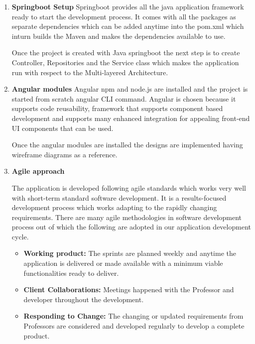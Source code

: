 \begin{enumerate}
        \item \textbf{Springboot Setup}\newline
        Springboot provides all the java application framework ready to start the development process. It comes with all the packages as separate dependencies which can be added anytime into the pom.xml which inturn builds the Maven and makes the dependencies available to use.
        
        Once the project is created with Java springboot the next step is to create Controller, Repositories and the Service class which makes the application run with respect to the Multi-layered Architecture. \newline
        
        \item \textbf{Angular modules}\newline
        Angular npm and node.js are installed and the project is started from scratch angular CLI command. 
        Angular is chosen because it supports code reusability, framework that supports component based development and supports many enhanced integration for appealing front-end UI components that can be used. \newline 
        
        Once the angular modules are installed the designs are implemented having wireframe diagrams as a reference.
        
      
        
        \item \textbf{Agile approach}
        
        The application is developed following agile standards which works very well with short-term standard software development.
        It is a results-focused development process which works adapting to the rapidly changing requirements. \newline
        There are many agile methodologies in software development process out of which the following are adopted in our application development cycle.
        
        \begin{itemize}
            \item \textbf{Working product:} The sprints are planned weekly and anytime the application is delivered or made available with a minimum viable functionalities ready to deliver.
            
            \item \textbf{Client Collaborations:} Meetings happened with the Professor and developer throughout the development.
            
            \item \textbf{Responding to Change:} The changing or updated requirements from Professors are considered and developed regularly to develop a complete product.
            
            \end{itemize}
    \end{enumerate}    
